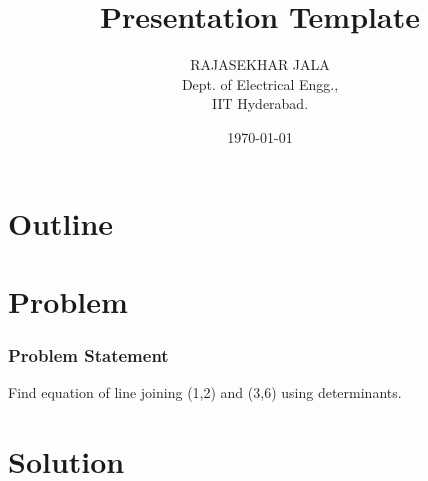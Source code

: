 \documentclass{beamer}
\title{Presentation Template}
\author{RAJASEKHAR JALA \\ Dept. of Electrical Engg.,\\IIT Hyderabad.}
\date{\today}
\theoremstyle{remark}
\newcommand{\myvec}[1]{\ensuremath{\begin{pmatrix}#1\end{pmatrix}}}
\let\vec\mathbf
\numberwithin{equation}{section}
\begin{document}
\begin{frame}
\titlepage
\end{frame}

\section*{Outline}
\begin{frame}
\tableofcontents
\end{frame}
\section{Problem}
\begin{frame}
\frametitle{Problem Statement}
%
Find equation of line joining (1,2) and
(3,6) using determinants.
%
\end{frame}

\section{Solution}
\end{document}
